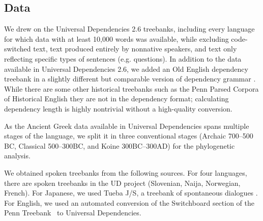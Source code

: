 \documentclass[9pt,twocolumn,twoside,lineno]{pnas-new}
\begin{document}
{%






\subsection*{Data}
We drew on the Universal Dependencies 2.6 treebanks, including every language for which data with at least 10,000 words was available, while excluding code-switched text, text produced entirely by nonnative speakers, and text only reflecting specific types of sentences (e.g. questions).
In addition to the data available in Universal Dependencies 2.6, we added an Old English dependency treebank in a slightly different but comparable version of dependency grammar \citep{bech2014iswoc}.
While there are some other historical treebanks such as the Penn Parsed Corpora of Historical English \citep{kroch2011penn} they are not in the dependency format; calculating dependency length is highly nontrivial without a high-quality conversion.

As the Ancient Greek data available in Universal Dependencies spans multiple stages of the language, we split it in three conventional stages (Archaic 700--500 BC, Classical 500--300BC, and Koine 300BC--300AD) for the phylogenetic analysis. 


We obtained spoken treebanks from the following sources.
For four languages, there are spoken treebanks in the UD project (Slovenian, Naija, Norwegian, French). For Japanese, we used Tueba J/S, a treebank of spontaneous dialogues \citep{hall2006conll}. For English, we used an automated conversion \citep{schuster2018sentences} of the Switchboard section of the Penn Treebank~\citep{marcus-building-1993} to Universal Dependencies.

}
\end{document}
